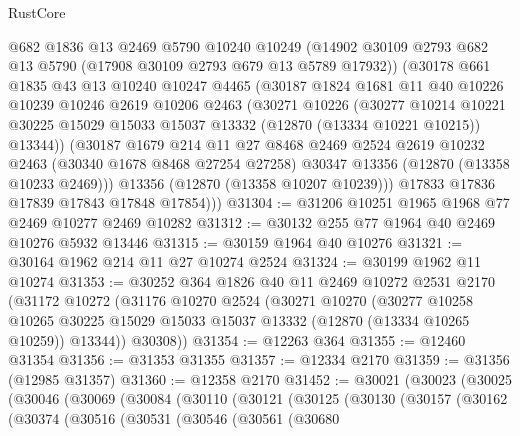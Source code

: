\begin{lexlean}{RustCore}
\begin{coremodule}
        @682
        @1836
        @13
        @2469
        @5790
        @10240
        @10249
        (@14902 @30109 @2793 @682 @13 @5790 (@17908 @30109 @2793 @679 @13 @5789 @17932))
        (@30178
          @661
          @1835
          @43
          @13
          @10240
          @10247
          @4465
          (@30187
            @1824
            @1681
            @11
            @40
            @10226
            @10239
            @10246
            @2619
            @10206
            @2463
            (@30271
              @10226
              (@30277
                @10214
                @10221
                @30225
                @15029
                @15033
                @15037
                @13332
                (@12870 (@13334 @10221 @10215))
                @13344))
            (@30187
              @1679
              @214
              @11
              @27
              @8468
              @2469
              @2524
              @2619
              @10232
              @2463
              (@30340 @1678 @8468 @27254 @27258)
              @30347
              @13356
              (@12870 (@13358 @10233 @2469)))
            @13356
            (@12870 (@13358 @10207 @10239)))
          @17833
          @17836
          @17839
          @17843
          @17848
          @17854)))
@31304 := @31206 @10251 @1965 @1968 @77 @2469 @10277 @2469 @10282
@31312 := @30132 @255 @77 @1964 @40 @2469 @10276 @5932 @13446
@31315 := @30159 @1964 @40 @10276
@31321 := @30164 @1962 @214 @11 @27 @10274 @2524
@31324 := @30199 @1962 @11 @10274
@31353 := @30252
    @364
    @1826
    @40
    @11
    @2469
    @10272
    @2531
    @2170
    (@31172
      @10272
      (@31176
        @10270
        @2524
        (@30271
          @10270
          (@30277
            @10258
            @10265
            @30225
            @15029
            @15033
            @15037
            @13332
            (@12870 (@13334 @10265 @10259))
            @13344))
        @30308))
@31354 := @12263 @364
@31355 := @12460 @31354
@31356 := @31353 @31355
@31357 := @12334 @2170
@31359 := @31356 (@12985 @31357)
@31360 := @12358 @2170
@31452 := @30021
    (@30023
      (@30025
        (@30046
          (@30069
            (@30084
              (@30110
                (@30121
                  (@30125
                    (@30130
                      (@30157
                        (@30162
                          (@30374
                            (@30516
                              (@30531
                                (@30546
                                  (@30561
                                    (@30680

\end{coremodule}
\end{lexlean}
